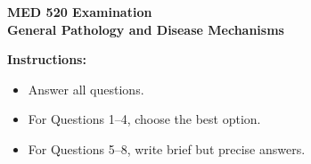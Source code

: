 \documentclass[11pt]{article}
\begin{document}
\begin{center}
  {\Large \textbf{MED 520 Examination}}\\[0.25em]
  {\large \textbf{General Pathology and Disease Mechanisms}}\\[0.5em]
\end{center}

\noindent\textbf{Instructions:}
\begin{itemize}
  \item Answer all questions.
  \item For Questions 1--4, choose the best option.
  \item For Questions 5--8, write brief but precise answers.
\end{itemize}

\vspace{0.5em}
\end{document}

